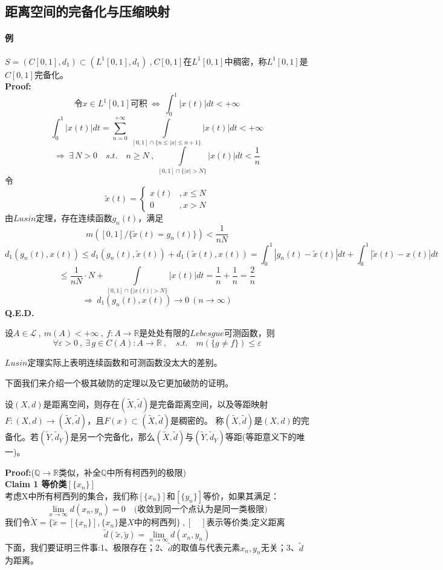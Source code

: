 \subsection{距离空间的完备化与压缩映射} \label{zip}
\paragraph*{例} \quad $S=(C[0,1],d_1) \subset (L^1[0,1],d_1) \ $,$ \ C[0,1]$在$L^1[0,1]$中稠密，称$L^1[0,1]$是$C[0,1]$完备化。\\
\textbf{Proof:}
\[\text{令}x \in L^1[0,1]\text{可积} \ \Leftrightarrow \ \int_0^1|x(t)|dt<+\infty\]
\[\int_0^1|x(t)|dt=\sum_{n=0}^{+\infty} \ \int\limits_{[0,1]\cap\{n \leq |x| \leq n+1\}}|x(t)|dt<+\infty \]
\[ \Rightarrow \ \exists \, N>0 \quad s.t. \quad n \geq N \ , \ \int\limits_{[0,1]\cap\{|x|>N\}}|x(t)|dt<\frac{1}{n}\]
令
\[\tilde{x}(t)=\left \{
\begin{array}{ll}
    x(t) & , x \leq N \\ 0 & , x>N
\end{array}    
\right .\]
由$Lusin$定理，存在连续函数$g_n(t)$，满足
\[m([0,1]/\{\tilde{x}(t)=g_n(t)\})<\frac{1}{nN}\]
\[d_1(g_n(t),x(t)) \leq d_1(g_n(t),\tilde{x}(t))+d_1(\tilde{x}(t),x(t))=\int_0^1|g_n(t)-\tilde{x}(t)|dt+\int_0^1|\tilde{x}(t)-x(t)|dt\]
\[\leq \frac{1}{nN} \cdot N+\int\limits_{[0,1]\cap\{|x(t)|>N\}}|x(t)|dt=\frac{1}{n}+\frac{1}{n}=\frac{2}{n}\]
\[\Rightarrow \ d_1(g_n(t),x(t)) \to 0 \ (n \to \infty)\]
\textbf{Q.E.D.}
\begin{theorem}[$Lusin$定理]
    设$A \in \mathscr{L} \ , \ m(A)<+\infty \ , \ f:A \to \mathbb{R}$是处处有限的$Lebesgue$可测函数，则
    \[\forall \varepsilon>0 \ , \ \exists \, g \in C(A):A\to \mathbb{R} \ , \quad s.t. \quad m(\{g \neq f\}) \leq \varepsilon\]
\end{theorem}
$Lusin$定理实际上表明连续函数和可测函数没太大的差别。

下面我们来介绍一个极其破防的定理以及它更加破防的证明。
\begin{theorem}[完备化定理]
    设$(X,d)$是距离空间，则存在$(\tilde{X},\tilde{d})$是完备距离空间，以及等距映射$F:(X,d) \rightarrow (\tilde{X},\tilde{d})$，且$F(x) \subset (\tilde{X},\tilde{d})$是稠密的。
    称$(\tilde{X},\tilde{d})$是$(X,d)$的完备化。若$(\tilde{Y},\tilde{d}_Y)$是另一个完备化，那么$(\tilde{X},\tilde{d})$与$(\tilde{Y},\tilde{d}_Y)$等距(等距意义下的唯一)。
\end{theorem}
\textbf{Proof:}($\mathbb{Q} \to \mathbb{R}$类似，补全$\mathbb{Q}$中所有柯西列的极限)\\
\textbf{Claim 1 等价类$[\{x_n\}]$}\\
考虑X中所有柯西列的集合，我们称$[\{x_n\}]$和$[\{y_n\}]$等价，如果其满足：
\[\lim_{x \to \infty}d(x_n,y_n)=0 \quad \text{(收敛到同一个点认为是同一类极限)}\]
我们令$\tilde{X}=\{\tilde{x}=[\{x_n\}],\{x_n\}\text{是}X\text{中的柯西列}\} \ $,$ \ [ \quad ]$表示等价类;定义距离
\[\tilde{d}(\tilde{x},\tilde{y})=\lim_{n \to \infty}d(x_n,y_n)\]
下面，我们要证明三件事:1、极限存在；2、$\tilde{d}$的取值与代表元素$x_n,y_n$无关；3、$\tilde{d}$为距离。

